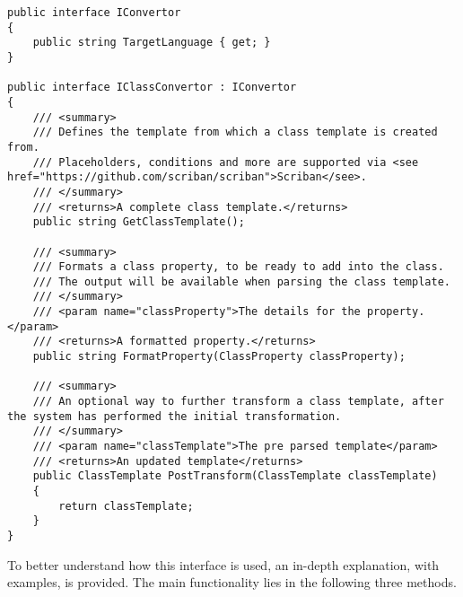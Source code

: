 \begin{lstlisting}[caption={IClassConvertor interface}, label={lst:class_converter}, style=base_csharp]
public interface IConvertor
{
    public string TargetLanguage { get; }
}

public interface IClassConvertor : IConvertor
{
    /// <summary>
    /// Defines the template from which a class template is created from.
    /// Placeholders, conditions and more are supported via <see href="https://github.com/scriban/scriban">Scriban</see>.
    /// </summary>
    /// <returns>A complete class template.</returns>
    public string GetClassTemplate();

    /// <summary>
    /// Formats a class property, to be ready to add into the class.
    /// The output will be available when parsing the class template.
    /// </summary>
    /// <param name="classProperty">The details for the property.</param>
    /// <returns>A formatted property.</returns>
    public string FormatProperty(ClassProperty classProperty);

    /// <summary>
    /// An optional way to further transform a class template, after the system has performed the initial transformation.
    /// </summary>
    /// <param name="classTemplate">The pre parsed template</param>
    /// <returns>An updated template</returns>
    public ClassTemplate PostTransform(ClassTemplate classTemplate)
    {
        return classTemplate;
    }
}
\end{lstlisting}
\noindent
To better understand how this interface is used, an in-depth explanation, with examples, is provided.
The main functionality lies in the following three methods.
